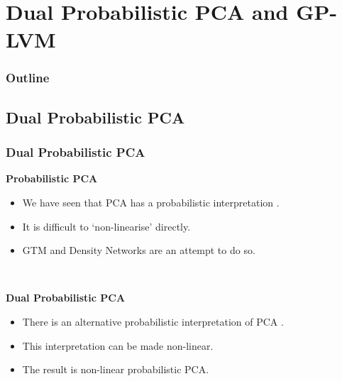 
\editme

\section{Dual Probabilistic PCA and GP-LVM}

\begin{frame}
  \frametitle{Outline}


\end{frame}

\subsection{Dual Probabilistic PCA}

\begin{frame}
  \frametitle{Dual Probabilistic PCA}

  \textbf{Probabilistic PCA}
  \begin{itemize}
  \item We have seen that PCA has a probabilistic interpretation {\scriptsize \citep{Tipping:probpca99}}.
  \item It is difficult to `non-linearise' directly.
  \item GTM and Density Networks are an attempt to do so.
  \end{itemize}
  ~

  \textbf{Dual Probabilistic PCA}
  \begin{itemize}
  \item There is an alternative probabilistic interpretation of PCA {\scriptsize \citep{Lawrence:pnpca05}}.
  \item This interpretation can be made non-linear.
  \item The result is non-linear probabilistic PCA.
  \end{itemize}

\end{frame}

